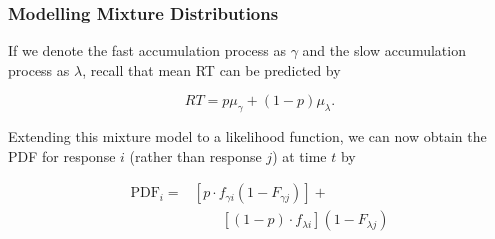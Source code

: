 \documentclass[a4paper, jou, natbib]{apa6}
\begin{document}
\subsubsection{Modelling Mixture Distributions}
If we denote the fast accumulation process as $\gamma$ and the slow accumulation process as $\lambda$, recall that mean RT can be predicted by

\begin{equation}
RT = p\mu_{\gamma} + (1 - p)\mu_{\lambda}.
\end{equation}

Extending this mixture model to a likelihood function, we can now obtain the PDF for response $i$ (rather than response $j$) at time $t$ by 

\begin{equation}
\begin{aligned}
\mbox{PDF}_{i} = &\left[p \cdot f_{\gamma i}(1 - F_{\gamma j})\right] + \\ 
&\qquad \left[(1 - p) \cdot f_{\lambda i}\right] (1 - F_{\lambda j})
\end{aligned}
\label{eq:tdLikelihood}
\end{equation}



\end{document}
